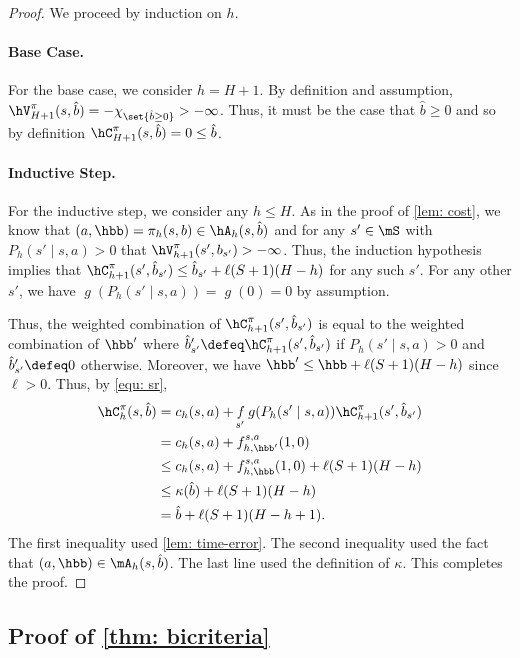\documentclass[pdftex, a4paper, 12pt]{article}
\newcommand{\hb}{\hat{b}}
\DeclareMathOperator*{\f}{\mathit{f}}
\DeclareMathOperator*{\g}{\mathit{g}}
\begin{document}
\begin{proof}
    We proceed by induction on $h$. 
    
    \paragraph{Base Case.} For the base case, we consider $h = H+1$. By definition and assumption, $\hV^{\pi}_{H+1}(s,\hb) = -\chi_{\set{\hb \geq 0}} > -\infty$. Thus, it must be the case that $\hb \geq 0$ and so by definition $\hC_{H+1}^{\pi}(s,\hb) = 0 \leq \hb$.

    \paragraph{Inductive Step.} For the inductive step, we consider any $h \leq H$. As in the proof of \cref{lem: cost}, we know that $(a, \hbb) = \pi_h(s,b) \in \hA_h(s,\hb)$ and for any $s' \in \mS$ with $P_h(s' \mid s,a) > 0$ that $\hV_{h+1}^{\pi}(s', b_{s'}) > -\infty$.
    Thus, the induction hypothesis implies that $\hC^{\pi}_{h+1}(s', \hb_{s'}) \leq \hb_{s'} + \ell(S+1)(H-h)$ for any such $s'$. For any other $s'$, we have $\g(P_h(s' \mid s,a)) = \g(0) = 0$ by assumption.
    
    Thus, the weighted combination of $\hC^{\pi}_{h+1}(s', \hb_{s'})$ is equal to the weighted combination of $\hbb'$ where $\hb'_{s'} \defeq \hC^{\pi}_{h+1}(s', \hb_{s'})$ if $P_h(s' \mid s,a) > 0$ and $\hb'_{s'} \defeq 0$ otherwise. Moreover, we have $\hbb' \leq \hbb + \ell(S+1)(H-h)$ since $\ell > 0$. Thus, by \eqref{equ: sr}, 
    \begin{align*}
        \hC^{\pi}_h(s,\hb) &= c_h(s, a) + \f_{s'} g(P_h(s' \mid s,a))\hC^{\pi}_{h+1}(s',\hb_{s'}) \\
        &= c_h(s,a) + f_{h, \hbb'}^{s,a}(1,0)\\
        &\leq c_h(s,a) + f_{h, \hbb}^{s,a}(1,0) + \ell(S+1)(H-h)\\
        &\leq \kappa(\hb) + \ell(S+1)(H-h)\\
        &= \hb + \ell(S+1)(H-h+1).
    \end{align*}
    The first inequality used \cref{lem: time-error}. The second inequality used the fact that $(a, \hbb) \in \mA_h(s,\hb)$. The last line used the definition of $\kappa$.
    This completes the proof.
\end{proof}

\subsection{Proof of \texorpdfstring{\cref{thm: bicriteria}}{thm: bicriteria}}
\end{document}
